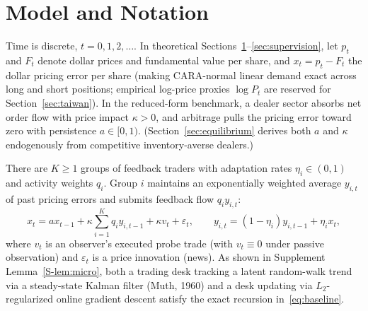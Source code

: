 \documentclass[11pt,letterpaper]{article}
\theoremstyle{definition}
\begin{document}
\section{Model and Notation}\label{sec:model}

Time is discrete, $t = 0, 1, 2, \dots$. In theoretical Sections~\ref{sec:model}--\ref{sec:supervision}, let $p_t$ and $F_t$ denote dollar prices and fundamental value per share, and $x_t = p_t - F_t$ the dollar pricing error per share (making CARA-normal linear demand exact across long and short positions; empirical log-price proxies $\log P_t$ are reserved for Section~\ref{sec:taiwan}). In the reduced-form benchmark, a dealer sector absorbs net order flow with price impact $\kappa > 0$, and arbitrage pulls the pricing error toward zero with persistence $a \in [0, 1)$. (Section~\ref{sec:equilibrium} derives both $a$ and $\kappa$ endogenously from competitive inventory-averse dealers.)

There are $K \ge 1$ groups of feedback traders with adaptation rates $\eta_i \in (0, 1)$ and activity weights $q_i$. Group $i$ maintains an exponentially weighted average $y_{i,t}$ of past pricing errors and submits feedback flow $q_i y_{i,t}$:
\begin{equation}\label{eq:baseline}
  x_t = a x_{t-1} + \kappa \sum_{i=1}^K q_i y_{i,t-1} + \kappa v_t + \varepsilon_t,
  \qquad
  y_{i,t} = (1 - \eta_i) y_{i,t-1} + \eta_i x_t,
\end{equation}
where $v_t$ is an observer's executed probe trade (with $v_t \equiv 0$ under passive observation) and $\varepsilon_t$ is a price innovation (news). As shown in Supplement Lemma~\ref{S-lem:micro}, both a trading desk tracking a latent random-walk trend via a steady-state Kalman filter (Muth, 1960) and a desk updating via $L_2$-regularized online gradient descent satisfy the exact recursion in~\eqref{eq:baseline}.
\end{document}
